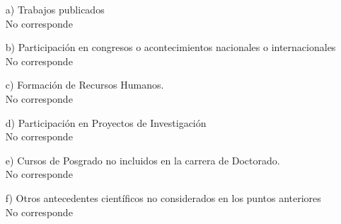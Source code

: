 \begin{enumerate}[leftmargin=0.8cm]
    \item[a)]{Trabajos publicados
        \\ No corresponde
    }

    \item[b)]{Participación en congresos o acontecimientos nacionales o internacionales
        \\ No corresponde
    }

    \item[c)]{Formación de Recursos Humanos.
        \\ No corresponde
    }

    \item[d)]{Participación en Proyectos de Investigación
        \\ No corresponde
    }

    \item[e)]{Cursos de Posgrado no incluidos en la carrera de Doctorado.
        \\ No corresponde
    }

    \item[f)]{Otros antecedentes científicos no considerados en los puntos anteriores
        \\ No corresponde
    }
\end{enumerate}

